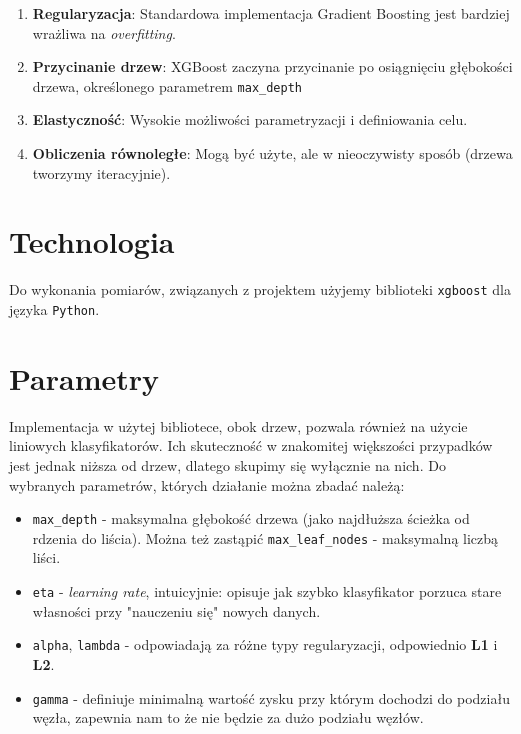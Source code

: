 \documentclass[a4paper,12p]{article}
\begin{document}
\begin{enumerate}
	\item \textbf{Regularyzacja}: Standardowa implementacja Gradient Boosting jest bardziej wrażliwa na \textit{overfitting}.
	\item \textbf{Przycinanie drzew}: XGBoost zaczyna przycinanie po osiągnięciu głębokości drzewa, określonego parametrem \texttt{max\_depth}
	\item \textbf{Elastyczność}: Wysokie możliwości parametryzacji i definiowania celu.
	\item \textbf{Obliczenia równoległe}: Mogą być użyte, ale w nieoczywisty sposób \cite{parallel} (drzewa tworzymy iteracyjnie).
\end{enumerate}


\section{Technologia}

Do wykonania pomiarów, związanych z projektem użyjemy biblioteki \texttt{xgboost} dla języka \texttt{Python}.

\section{Parametry}

Implementacja w użytej bibliotece, obok drzew, pozwala również na użycie liniowych klasyfikatorów. Ich skuteczność w znakomitej większości przypadków jest jednak niższa od drzew, dlatego skupimy się wyłącznie na nich. Do wybranych parametrów, których działanie można zbadać należą:

\begin{itemize}
	\item \texttt{max\_depth} - maksymalna głębokość drzewa (jako najdłuższa ścieżka od rdzenia do liścia). Można też zastąpić \texttt{max\_leaf\_nodes} - maksymalną liczbą liści.
	\item \texttt{eta} - \textit{learning rate}, intuicyjnie: opisuje jak szybko klasyfikator porzuca stare własności przy "nauczeniu się" nowych danych.
	\item \texttt{alpha}, \texttt{lambda} - odpowiadają za różne typy regularyzacji, odpowiednio \textbf{L1} i \textbf{L2}. 
	\item \texttt{gamma} - definiuje minimalną wartość zysku przy którym dochodzi do podziału węzła, zapewnia nam to że nie będzie za dużo podziału węzłów.
\end{itemize}
\end{document}

